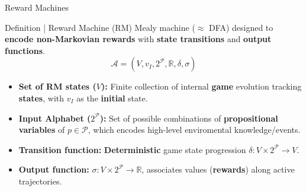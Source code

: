\documentclass[10pt, aspectratio=169]{beamer}
\newcommand{\evidenzia}[1]{\textcolor{verdeSalvia}{\textbf{#1}}}
\begin{document}
\begin{frame}{Reward Machines}
    \begin{block}{Definition | Reward Machine (RM)}
        Mealy machine ($\approx$ DFA) designed to \evidenzia{encode non-Markovian rewards} with \evidenzia{state transitions} and \evidenzia{output functions}.$$\mathcal{A}=(V,v_{I},2^{\mathcal{P}},\mathbb{R},\delta,\sigma)$$
        
        \begin{itemize}
            \item \textbf{Set of RM states ($V$):} Finite collection of internal \evidenzia{game} evolution tracking \evidenzia{states}, with $v_{I}$ as the \evidenzia{initial} state.
            \item \textbf{Input Alphabet ($2^{\mathcal{P}}$):} Set of possible combinations of \evidenzia{propositional variables} of $p\in \mathcal{P}$, which encodes high-level enviromental knowledge/events. %
            \item \textbf{Transition function:} \evidenzia{Deterministic} game state progression $\delta:V\times2^{\mathcal{P}}\rightarrow V$.
            \item \textbf{Output function:} $\sigma:V\times2^{\mathcal{P}}\rightarrow\mathbb{R}$, associates values (\evidenzia{rewards}) along active trajectories.
        \end{itemize}
    \end{block}
\end{frame}
\end{document}
